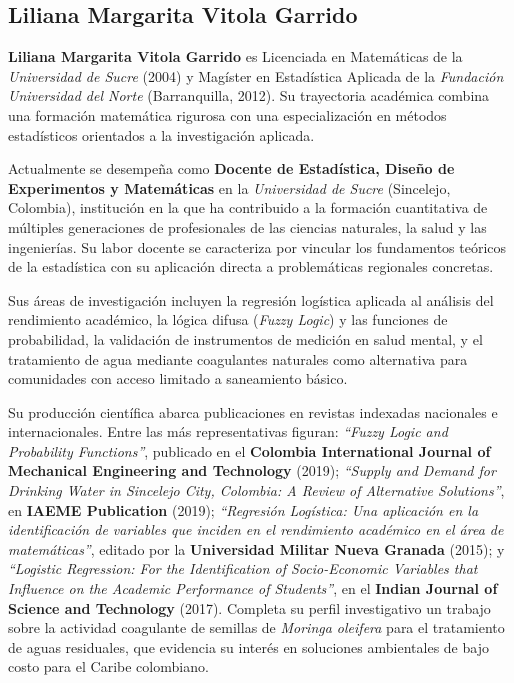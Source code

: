 \bigskip\bigskip

\subsection*{Liliana Margarita Vitola Garrido}

\noindent
\textbf{Liliana Margarita Vitola Garrido} es Licenciada en Matemáticas de la
\textit{Universidad de Sucre} (2004) y Magíster en Estadística Aplicada de la
\textit{Fundación Universidad del Norte} (Barranquilla, 2012). Su trayectoria
académica combina una formación matemática rigurosa con una especialización en
métodos estadísticos orientados a la investigación aplicada.

\medskip

Actualmente se desempeña como \textbf{Docente de Estadística, Diseño de Experimentos
y Matemáticas} en la \textit{Universidad de Sucre} (Sincelejo, Colombia), institución
en la que ha contribuido a la formación cuantitativa de múltiples generaciones de
profesionales de las ciencias naturales, la salud y las ingenierías. Su labor docente
se caracteriza por vincular los fundamentos teóricos de la estadística con su
aplicación directa a problemáticas regionales concretas.

\medskip

Sus áreas de investigación incluyen la regresión logística aplicada al análisis del
rendimiento académico, la lógica difusa (\textit{Fuzzy Logic}) y las funciones de
probabilidad, la validación de instrumentos de medición en salud mental, y el
tratamiento de agua mediante coagulantes naturales como alternativa para comunidades
con acceso limitado a saneamiento básico.

\medskip

Su producción científica abarca publicaciones en revistas indexadas nacionales e
internacionales. Entre las más representativas figuran: \textit{``Fuzzy Logic and
Probability Functions''}, publicado en el \textbf{Colombia International Journal of
Mechanical Engineering and Technology} (2019); \textit{``Supply and Demand for
Drinking Water in Sincelejo City, Colombia: A Review of Alternative Solutions''},
en \textbf{IAEME Publication} (2019); \textit{``Regresión Logística: Una aplicación
en la identificación de variables que inciden en el rendimiento académico en el área
de matemáticas''}, editado por la \textbf{Universidad Militar Nueva Granada} (2015);
y \textit{``Logistic Regression: For the Identification of Socio-Economic Variables
that Influence on the Academic Performance of Students''}, en el
\textbf{Indian Journal of Science and Technology} (2017). Completa su perfil
investigativo un trabajo sobre la actividad coagulante de semillas de
\textit{Moringa oleifera} para el tratamiento de aguas residuales, que evidencia
su interés en soluciones ambientales de bajo costo para el Caribe colombiano.
